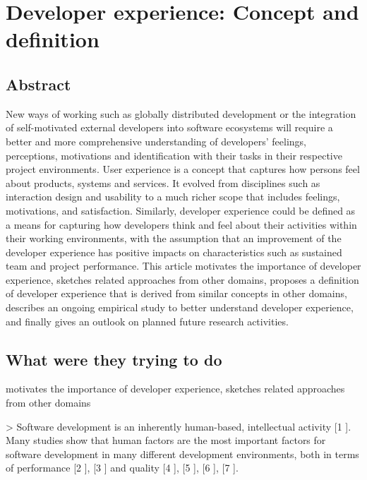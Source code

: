 \section{Developer experience: Concept and definition}

\subsection{Abstract}

New ways of working such as globally distributed development or the integration of self-motivated external developers into software ecosystems will require a better and more comprehensive understanding of developers' feelings, perceptions, motivations and identification with their tasks in their respective project environments. User experience is a concept that captures how persons feel about products, systems and services. It evolved from disciplines such as interaction design and usability to a much richer scope that includes feelings, motivations, and satisfaction. Similarly, developer experience could be defined as a means for capturing how developers think and feel about their activities within their working environments, with the assumption that an improvement of the developer experience has positive impacts on characteristics such as sustained team and project performance. This article motivates the importance of developer experience, sketches related approaches from other domains, proposes a definition of developer experience that is derived from similar concepts in other domains, describes an ongoing empirical study to better understand developer experience, and finally gives an outlook on planned future research activities.

\subsection{What were they trying to do}

motivates the importance of developer experience, sketches related approaches from other domains

> Software development is an inherently human-based, intellectual activity [1 \cite{endresHandbookSoftwareSystems2003}]. Many studies show that human factors are the most important factors for software development in many different development environments, both in terms of performance [2 \cite{sackmanExploratoryExperimentalStudies1968}], [3 \cite{demarcoProgrammerPerformanceEffects1985}] and quality [4 \cite{mockusOrganizationalVolatilityIts2010}], [5 \cite{nagappanInfluenceOrganizationalStructure2008}], [6 \cite{birdPuttingItAll2009}], [7 \cite{trendowiczChapterFactorsInfluencing2009}].

